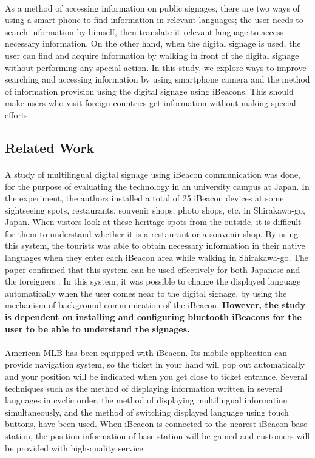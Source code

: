 \documentclass[12pt]{article}
\begin{document}
\paragraph{}As a method of accessing information on public signages, there are two ways of using a smart phone to find information in relevant languages; the user needs to search information by himself, then translate it relevant language to access necessary information. On the other hand, when the digital signage is used, the user can find and acquire information by walking in front of the digital signage without performing any special action. In this study, we explore ways to improve searching and accessing information by using smartphone camera and the method of information provision using the digital signage using iBeacons. This should make users who visit foreign countries get information without making special efforts. 

\subsection{Related Work}

\paragraph{} A study of multilingual digital signage using iBeacon communication was done, for the purpose of evaluating the technology in an university campus at Japan.  \cite{one} In the experiment, the authors installed a total of 25 iBeacon devices at some sightseeing spots, restaurants, souvenir shops, photo shops, etc. in Shirakawa-go, Japan. When vistors look at these heritage spots from the outside, it is difficult for them to understand whether it is a restaurant or a souvenir shop. By using this system, the tourists was able to obtain necessary information in their native languages when they enter each iBeacon area while walking in Shirakawa-go. The paper confirmed that this system can be used effectively for both Japanese and the foreigners \cite{one}.  In this system, it was possible to change the displayed language automatically when the user comes near to the digital signage, by using the mechanism of background communication of the iBeacon. \textbf{However, the study is dependent on installing and configuring bluetooth iBeacons for the user to be able to understand the signages.}

\paragraph{}American MLB has been equipped with iBeacon. Its mobile application can provide navigation system, so the ticket in your hand will pop out automatically and your position will be indicated when you get close to ticket entrance. Several techniques such as the method of displaying information written in several languages in cyclic order, the method of displaying multilingual information simultaneously, and the method of switching displayed language using touch buttons, have been used. \cite{zoo} When iBeacon is connected to the nearest iBeacon base station, the position information of base station will be gained and customers will be provided with high-quality service.\cite{taiwan} \cite{room}
\end{document}
